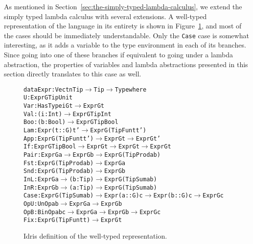 As mentioned in Section~\ref{sec:the-simply-typed-lambda-calculus}, we extend the simply typed lambda calculus with several extensions. A well-typed representation of the language in its entirety is shown in Figure~\ref{fig:idris-def-expr-lang}, and most of the cases should be immediately understandable. Only the \texttt{Case} case is somewhat interesting, as it adds a variable to the type environment in each of its branches. Since going into one of these branches if equivalent to going under a lambda abstraction, the properties of variables and lambda abstractions presented in this section directly translates to this case as well.

\begin{figure}
\begin{alltt}
  data Expr : Vect n Tip \(\rightarrow\) Tip \(\rightarrow\) Type where
    U    : Expr G TipUnit
    Var  : HasType i G t \(\rightarrow\) Expr G t
    Val  : (i : Int) \(\rightarrow\) Expr G TipInt
    Boo  : (b : Bool) \(\rightarrow\) Expr G TipBool
    Lam  : Expr (t :: G) t' \(\rightarrow\) Expr G (TipFun t t')
    App  : Expr G (TipFun t t') \(\rightarrow\) Expr G t \(\rightarrow\) Expr G t'
    If   : Expr G TipBool \(\rightarrow\) Expr G t \(\rightarrow\) Expr G t \(\rightarrow\) Expr G t
    Pair : Expr G a \(\rightarrow\) Expr G b \(\rightarrow\) Expr G (TipProd a b)
    Fst  : Expr G (TipProd a b) \(\rightarrow\) Expr G a
    Snd  : Expr G (TipProd a b) \(\rightarrow\) Expr G b
    InL  : Expr G a \(\rightarrow\) (b: Tip) \(\rightarrow\) Expr G (TipSum a b)
    InR  : Expr G b \(\rightarrow\) (a: Tip) \(\rightarrow\) Expr G (TipSum a b)
    Case : Expr G (TipSum a b) \(\rightarrow\) Expr (a :: G) c \(\rightarrow\) Expr (b :: G) c \(\rightarrow\) Expr G c
    OpU  : UnOp a b \(\rightarrow\) Expr G a \(\rightarrow\) Expr G b
    OpB  : BinOp a b c \(\rightarrow\) Expr G a \(\rightarrow\) Expr G b \(\rightarrow\) Expr G c
    Fix  : Expr G (TipFun t t) \(\rightarrow\) Expr G t
\end{alltt}
\caption{Idris definition of the well-typed representation.}
\label{fig:idris-def-expr-lang}
\end{figure}



